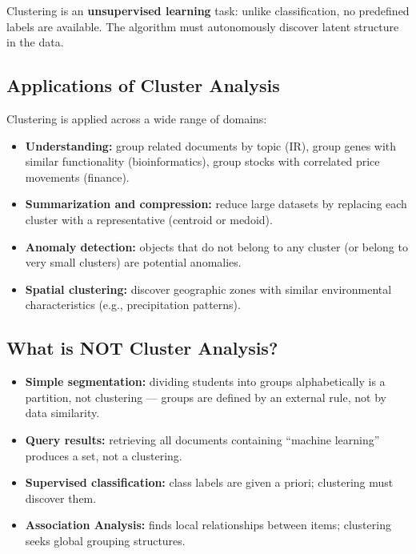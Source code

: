 Clustering is an \textbf{unsupervised learning} task: unlike classification, no predefined labels are available. The algorithm must autonomously discover latent structure in the data.

\subsection{Applications of Cluster Analysis}

Clustering is applied across a wide range of domains:

\begin{itemize}
  \item \textbf{Understanding:} group related documents by topic (IR), group genes with similar functionality (bioinformatics), group stocks with correlated price movements (finance).
  \item \textbf{Summarization and compression:} reduce large datasets by replacing each cluster with a representative (centroid or medoid).
  \item \textbf{Anomaly detection:} objects that do not belong to any cluster (or belong to very small clusters) are potential anomalies.
  \item \textbf{Spatial clustering:} discover geographic zones with similar environmental characteristics (e.g., precipitation patterns).
\end{itemize}

\subsection{What is NOT Cluster Analysis?}

\begin{itemize}
  \item \textbf{Simple segmentation:} dividing students into groups alphabetically is a partition, not clustering — groups are defined by an external rule, not by data similarity.
  \item \textbf{Query results:} retrieving all documents containing ``machine learning'' produces a set, not a clustering.
  \item \textbf{Supervised classification:} class labels are given a priori; clustering must discover them.
  \item \textbf{Association Analysis:} finds local relationships between items; clustering seeks global grouping structures.
\end{itemize}

